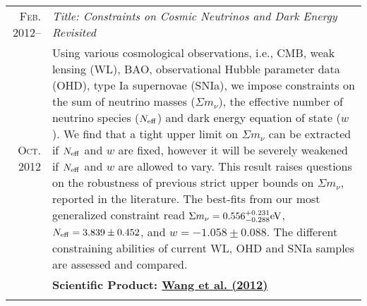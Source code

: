 \documentclass[letterpaper,10pt]{article}
\begin{document}
\begin{longtable}{r|p{5.5in}}
  \textsc{Feb. 2012}--   &   \emph{Title: Constraints on Cosmic Neutrinos and Dark Energy Revisited}  \\
  \textsc{Oct. 2012}     &   \small{Using various cosmological observations, i.e., CMB, weak lensing (WL), BAO, observational Hubble
  parameter data (OHD), type Ia supernovae (SNIa), we impose constraints on the sum of neutrino masses ($\Sigma m_{\nu}$), the
  effective number of neutrino species ($N_{\rm eff}$) and dark energy equation of state ($w$). We find that a tight upper limit
  on $\Sigma m_{\nu}$ can be extracted if $N_{\rm eff}$ and $w$ are fixed, however it will be severely weakened if $N_{\rm eff}$ and
  $w$ are allowed to vary. This result raises questions on the robustness of previous strict upper bounds on $\Sigma m_{\nu}$,
  reported in the literature. The best-fits from our most generalized constraint read $\Sigma m_{\nu}=0.556^{+0.231}_{-0.288}\rm
  eV$, $N_{\rm eff}=3.839\pm0.452$, and $w=-1.058\pm0.088$. The different constraining abilities of current WL, OHD and SNIa samples 
  are assessed and compared.}\\
  &   \textbf{Scientific Product: \hyperlink{12.wang.jcap}{Wang et al. (2012)}}  \\
  \multicolumn{2}{c}{} \\

\end{longtable}
\end{document}
